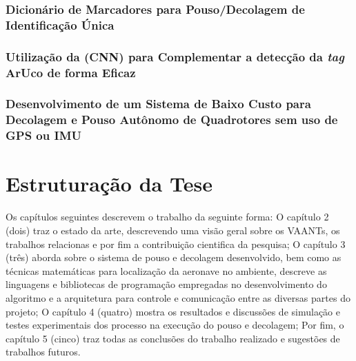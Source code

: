 	\subsubsection{Dicionário de Marcadores para Pouso/Decolagem de Identificação Única}

	\subsubsection{Utilização da (CNN) para Complementar a detecção da \textit{tag} ArUco de forma Eficaz}

	\subsubsection{Desenvolvimento de um Sistema de Baixo Custo para Decolagem e Pouso Autônomo de Quadrotores sem uso de GPS ou IMU}

\section{Estruturação da Tese}

Os capítulos seguintes descrevem o trabalho da seguinte forma: O capítulo 2 (dois) traz o estado da arte, descrevendo uma visão geral sobre os VAANTs, os trabalhos relacionas e por fim a contribuição cientifica da pesquisa; O capítulo 3 (três) aborda sobre o sistema de pouso e decolagem desenvolvido, bem como as técnicas matemáticas para localização da aeronave no ambiente, descreve as linguagens e bibliotecas de programação empregadas no desenvolvimento do algoritmo e a arquitetura para controle e comunicação entre as diversas partes do projeto; O capítulo 4 (quatro) mostra os resultados e discussões de simulação e testes experimentais dos processo na execução do pouso e decolagem; Por fim, o capítulo 5 (cinco) traz todas as conclusões do trabalho realizado e sugestões de trabalhos futuros.




